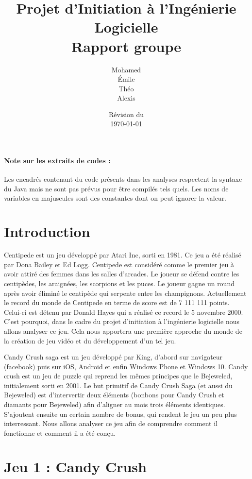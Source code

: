 \documentclass[a4paper, 12pt, oneside]{article}
\title{Projet d'Initiation à l'Ingénierie Logicielle\\Rapport groupe \no 3}
\author{Mohamed \bsc{Lakhal}\\Émile \bsc{Jeannin}\\Théo \bsc{Mottet}\\Alexis \bsc{Cabodi}}
\date{Révision du\\\today}
\begin{document}
\maketitle
\newpage
\tableofcontents
\bigskip
\paragraph*{Note sur les extraits de codes :} Les encadrés contenant du code présents dans les analyses respectent la syntaxe du Java mais ne sont pas prévus pour être compilés tels quels. Les noms de variables en majuscules sont des constantes dont on peut ignorer la valeur.
\newpage

\section{Introduction}
Centipede est un jeu développé par Atari Inc, sorti en 1981. Ce jeu a été réalisé par Dona Bailey et Ed Logg. Centipede est considéré comme le premier jeu à avoir attiré des femmes dans les salles d'arcades. 
Le joueur se défend contre les centipèdes, les araignées, les scorpions et les puces. Le joueur gagne un round après avoir éliminé le centipède qui serpente entre les champignons. Actuellement le record du monde de Centipede en terme de score est de 7 111 111 points. Celui-ci est détenu par Donald Hayes qui a réalisé ce record le 5 novembre 2000. 
C'est pourquoi, dans le cadre du projet d'initiation à l'ingénierie logicielle nous allons analyser ce jeu. Cela nous apportera une première approche du monde de la création de jeu vidéo et du développement d'un tel jeu. 

Candy Crush saga est un jeu développé par King, d'abord sur navigateur (facebook) puis sur iOS, Android et enfin Windows Phone et Windows 10. Candy crush est un jeu de puzzle qui reprend les mêmes principes que le Bejeweled, initialement sorti en 2001. Le but primitif de Candy Crush Saga (et aussi du Bejeweled) est d'intervertir deux éléments (bonbons pour Candy Crush et diamants pour Bejeweled) afin d'aligner au mois trois éléments identiques. S'ajoutent ensuite un certain nombre de bonus, qui rendent le jeu un peu plus interressant. Nous allons analyser ce jeu afin de comprendre comment il fonctionne et comment il a été conçu.

\section{Jeu 1 : Candy Crush}

\end{document}
